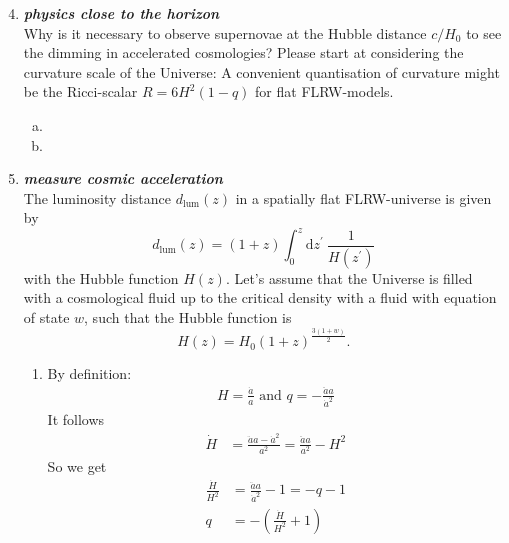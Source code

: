 \documentclass[a4paper,12pt]{article}
\newcommand{\question}[1]{\textbf{\textit{#1}}}
\begin{document}
        \begin{enumerate}
        \setcounter{enumi}{3}
		\item \question{physics close to the horizon}\\
		Why is it necessary to observe supernovae at the Hubble distance $c/H_0$ to see the dimming in accelerated cosmologies? Please start at considering the curvature scale of the Universe: A convenient quantisation of curvature might be the Ricci-scalar $R = 6H^2(1-q)$ for flat FLRW-models.
		\begin{enumerate}[(a)]
			\item
			\item 
		\end{enumerate}
		
		
		\item \question{measure cosmic acceleration}\\
		The luminosity distance $d_\mathrm{lum}(z)$ in a spatially flat FLRW-universe is given by
		\begin{equation}
		d_\mathrm{lum}(z) = (1+z)\int_0^z\mathrm{d}z^\prime\:\frac{1}{H(z^\prime)}
		\end{equation}
		with the Hubble function $H(z)$. Let's assume that the Universe is filled with a cosmological fluid up to the critical density with a fluid with equation of state $w$, such that the Hubble function is
		\begin{equation}
		H(z) = H_0 (1+z)^\frac{3(1+w)}{2}.
		\end{equation}
		\begin{enumerate}
			\item
					By definition:
					\begin{align*}
	H=\frac{\dot{a}}{a} \text{ and } q=-\frac{\ddot{a}a}{\dot{a}^2}
		\end{align*}
		It follows
		\begin{align*}
		\dot{H}&=\frac{\ddot{a}a-\dot{a}^2}{a^2}=\frac{\ddot{a}a}{a^2}-H^2		
		\end{align*}
		So we get
		\begin{align*}
		\frac{\dot{H}}{H^2}&=\frac{\ddot{a}a}{\dot{a}^2}-1=-q-1\\
		q&=-(\frac{\dot{H}}{H^2}+1)	
		\end{align*}
	

\end{enumerate}
\end{enumerate}
\end{document}
